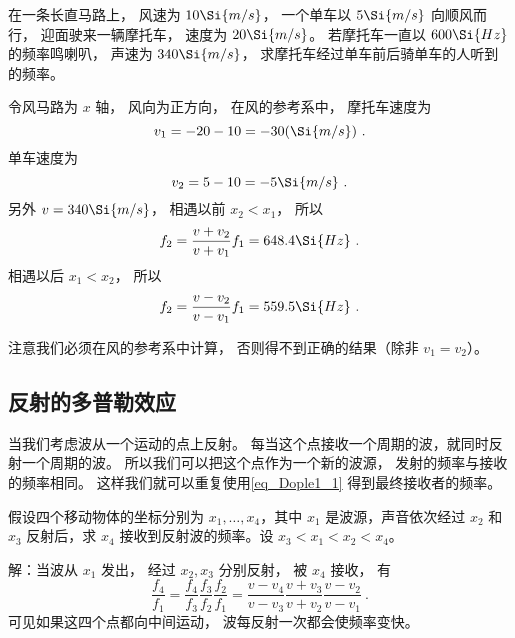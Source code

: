 \begin{exercise}{}
在一条长直马路上， 风速为 $10\Si{m/s}$， 一个单车以 $5\Si{m/s}$ 向顺风而行， 迎面驶来一辆摩托车， 速度为 $20\Si{m/s}$。 若摩托车一直以 $600\Si{Hz}$ 的频率鸣喇叭， 声速为 $340\Si{m/s}$， 求摩托车经过单车前后骑单车的人听到的频率。

令风马路为 $x$ 轴， 风向为正方向， 在风的参考系中， 摩托车速度为
\begin{equation}
v_1 = -20 - 10 = -30(\Si{m/s})~.
\end{equation}
单车速度为
\begin{equation}
v_2 = 5 - 10 = -5\Si{m/s}~.
\end{equation}
另外 $v = 340\Si{m/s}$， 相遇以前 $x_2 < x_1$， 所以
\begin{equation}
f_2 = \frac{v + v_2}{v + v_1} f_1 = 648.4\Si{Hz}~.
\end{equation}
相遇以后 $x_1 < x_2$， 所以
\begin{equation}
f_2 = \frac{v - v_2}{v - v_1} f_1 = 559.5\Si{Hz}~.
\end{equation}
\end{exercise}
注意我们必须在风的参考系中计算， 否则得不到正确的结果（除非 $v_1 = v_2$）。

\subsection{反射的多普勒效应}
当我们考虑波从一个运动的点上反射。 每当这个点接收一个周期的波，就同时反射一个周期的波。 所以我们可以把这个点作为一个新的波源， 发射的频率与接收的频率相同。 这样我们就可以重复使用\autoref{eq_Dople1_1} 得到最终接收者的频率。

\begin{example}{}
假设四个移动物体的坐标分别为 $x_1,\dots,x_4$，其中 $x_1$ 是波源，声音依次经过 $x_2$ 和 $x_3$ 反射后，求 $x_4$ 接收到反射波的频率。设 $x_3 < x_1 < x_2 < x_4$。

解：当波从 $x_1$ 发出， 经过 $x_2, x_3$ 分别反射， 被 $x_4$ 接收， 有
\begin{equation}
\frac{f_4}{f_1} = \frac{f_4}{f_3}\frac{f_3}{f_2}\frac{f_2}{f_1}
= \frac{v - v_4}{v - v_3}\frac{v + v_3}{v + v_2}\frac{v - v_2}{v - v_1}~.
\end{equation}
可见如果这四个点都向中间运动， 波每反射一次都会使频率变快。
\end{example}


